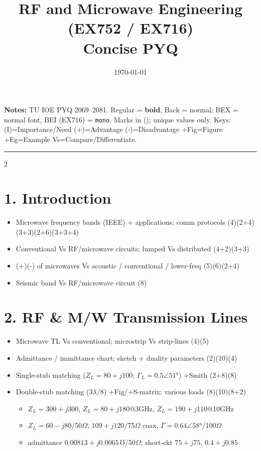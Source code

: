 \documentclass[10pt]{article}
\title{RF and Microwave Engineering (EX752 / EX716)\\[0.3em]\large Concise PYQ}
\author{}
\date{\today}
\begin{document}
\maketitle
\vspace{-1em}
\small
\textbf{Notes:} TU IOE PYQ 2069--2081. Regular = \textbf{bold}, Back = normal; BEX = normal font, BEI (EX716) = \texttt{mono}.
Marks in (); unique values only.
Keys: (I)=Importance/Need \quad (+)=Advantage \quad (-)=Disadvantage \quad +Fig=Figure \quad +Eg=Example \quad Vs=Compare/Differentiate.
\vspace{2pt}
\hrule
\vspace{4pt}

\begin{multicols}{2}
\footnotesize

\section*{1. Introduction}
\begin{itemize}
  \item Microwave frequency bands (IEEE) + applications; comm protocols \hfill (4)(2+4)(3+3)(2+6)(3+3+4)
  \item Conventional Vs RF/microwave circuits; lumped Vs distributed \hfill (4+2)(3+3)
  \item (+)(-) of microwaves Vs acoustic / conventional / lower-freq \hfill (5)(6)(2+4)
  \item Seismic band Vs RF/microwave circuit \hfill (8)
\end{itemize}

\section*{2. RF \& M/W Transmission Lines}
\begin{itemize}
  \item Microwave TL Vs conventional; microstrip Vs strip-lines \hfill (4)(5)
  \item Admittance / immittance chart; sketch + duality parameters \hfill (2)(10)(4)
  \item Single-stub matching ($Z_L{=}80{+}j100$; $\Gamma_L{=}0.5\angle51°$) +Smith \hfill (2+8)(8)
  \item Double-stub matching ($3\lambda/8$) +Fig/+S-matrix; various loads \hfill (8)(10)(8+2)
    \begin{itemize}
      \item $Z_L{=}300{+}j300$, $Z_L{=}80{+}j180$@3GHz, $Z_L{=}190{+}j110$@10GHz
      \item $Z_L{=}60{-}j80$/50$\Omega$, $109{+}j120$/75$\Omega$ coax, $\Gamma{=}0.64\angle58°$/100$\Omega$
      \item admittance $0.00813{+}j0.0065\,\mho$/50$\Omega$; short-ckt $75{+}j75$, $0.4{+}j0.85$
    \end{itemize}
\end{itemize}


\end{multicols}
\end{document}
